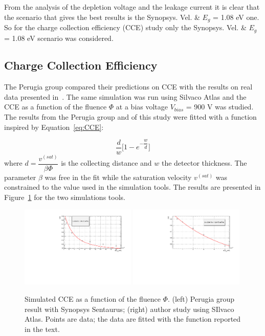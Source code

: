 From the analysis of the depletion voltage and the leakage current it is clear that the scenario 
that gives the best results is the Synopsys. Vel. \& $E_g$ = 1.08 eV one.
So for the charge collection efficiency (CCE) study only the Synopsys. Vel. \& $E_g$ = 1.08 eV scenario 
was considered.

\subsection{Charge Collection Efficiency}

The Perugia group compared their predictions on CCE with the results on real data presented 
in~\cite{Affolder:2010zz}. The same simulation was run using Silvaco Atlas and the CCE as a function 
of the fluence $\Phi$ at a bias voltage $V_{bias}$ = 900 V was studied. The results from the Perugia 
group and of this study were fitted with a function inspired by Equation~\ref{eq:CCE}:

\begin{equation}
\dfrac{d}{w}\Big[ 1-e^{-\dfrac{w}{d}} \Big]
\label{eq:SimpleCCE}
\end{equation} 
where $d=\dfrac{v^{(sat)}}{\beta\Phi}$ is the collecting distance and $w$ the detector thickness.
The parameter $\beta$ was free in the fit while the saturation velocity $v^{(sat)}$ was constrained 
to the value used in the simulation tools. The results are presented in Figure~\ref{fig:cce_sims} 
for the two simulations tools.
\begin{figure}[!htpb]
\centering
\includegraphics[width=0.49\textwidth]{cce_sims.pdf}
\includegraphics[width=0.49\textwidth]{cce_no_mult_Perugia_Synopsys_Eg108_900V.pdf}
\caption{\label{fig:cce_sims}Simulated CCE as a function of the fluence $\Phi$. (left) Perugia group 
result with Synopsys Sentaurus; (right) author study using SIlvaco Atlas. Points are data; the 
data are fitted with the function reported in the text.}
\end{figure}

